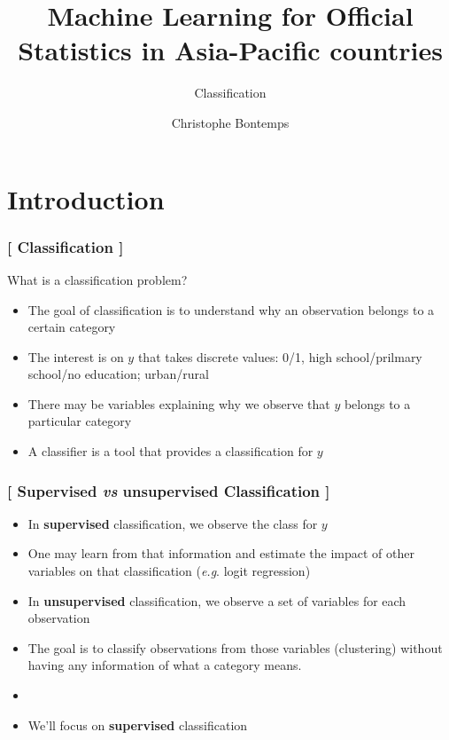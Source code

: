 \documentclass[xcolor=x11names,compress]{beamer}
\title{\textcolor{siap}{Machine Learning for Official Statistics in Asia-Pacific countries \\ \vspace{0.5cm} }}
\subtitle{\textcolor{brique}{\Large{Classification}}}
\author{\textcolor{siap}{Christophe Bontemps}}
\institute{ \texttt{[image: SIAP\_logo\_Big.png]}}
\date{}
\renewcommand{\(}{\begin{columns}}
\renewcommand{\)}{\end{columns}}
\newcommand{\<}[1]{\begin{column}{#1}}
\renewcommand{\>}{\end{column}}
\begin{document}
\begin{frame}
  \titlepage
\end{frame}


\section{Introduction}

\begin{frame}

\frametitle{\textcolor{brique}{[ Classification ]}}
What is a classification problem?
\pause
\begin{itemize}[<+->]
  \item The goal of classification is to understand why an observation belongs to a certain category
  \item The interest is on $y$ that takes discrete values:  0/1, high school/prilmary school/no education; urban/rural
  \item There may be variables explaining why we observe that $y$ belongs to a particular category
  \item A classifier is a tool that  provides a classification for $y$
\end{itemize}
\end{frame}

\begin{frame} %
\frametitle{\textcolor{brique}{[ Supervised \textit{vs} unsupervised Classification ]}}
\pause
\begin{itemize}[<+->]
  \item In \textbf{supervised }classification, we observe the class for  $y$
  \item[] One may learn from that information and estimate the impact of other variables on that classification (\textit{e.g}. logit regression)
   \item In \textbf{unsupervised }classification, we observe a set of variables for each observation
  \item[]  The goal is to classify observations from those variables (clustering) without having any information of what a category means.
  \item[]
  \item We'll focus on \textbf{supervised }classification
\end{itemize}
\end{frame}
\end{document}
